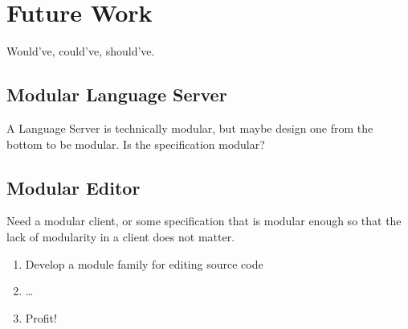 \chapter{Future Work}

Would've, could've, should've.

\section{Modular Language Server}

A Language Server is technically modular, but maybe design one from the bottom
to be modular. Is the specification modular?

\section{Modular Editor}

Need a modular client, or some specification that is modular enough so that the
lack of modularity in a client does not matter.

\begin{enumerate}
  \item Develop a module family for editing source code
  \item \dots
  \item Profit!
\end{enumerate}
